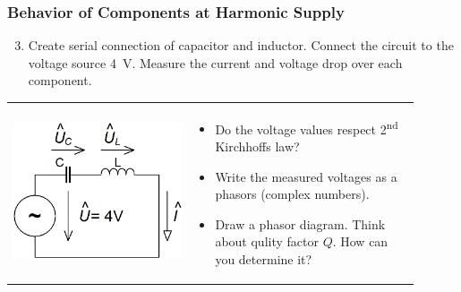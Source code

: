 \documentclass{beamer}
\begin{document}
	\begin{frame}
    \frametitle{Behavior of Components at Harmonic Supply}
		\begin{enumerate}
			\setcounter{enumi}{2}
			\item Create serial connection of capacitor and inductor. Connect the circuit to the voltage source 4~V. Measure the current and voltage drop over each component.
		\end{enumerate}
		
		\begin{center}
			\begin{tabular}{m{0.4\linewidth} m{0.5\linewidth}}
			\includegraphics[scale=0.25]{obr04_LCobvod.png} &
			
			\begin{itemize}
				\item Do the voltage values respect 2\textsuperscript{nd} Kirchhoffs law?
				\item Write the measured voltages as a phasors (complex numbers).
				\item Draw a phasor diagram. Think about qulity factor $Q$. How can you determine it?
			\end{itemize}
			\end{tabular}
		\end{center}
	\end{frame}
\end{document}
